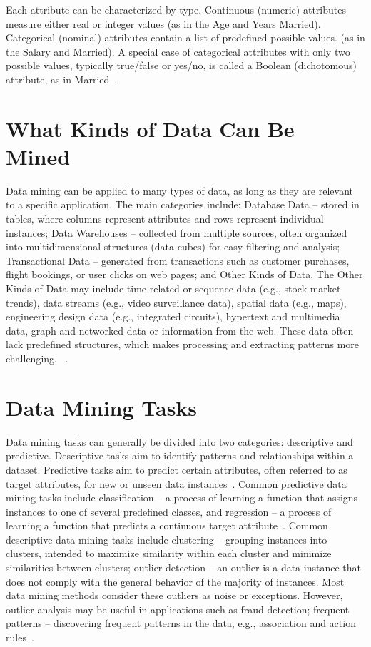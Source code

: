 Each attribute can be characterized by type. Continuous (numeric) attributes measure either real or integer values (as in the Age and Years Married). Categorical (nominal) attributes contain a list of predefined possible values. (as in the Salary and Married). A special case of categorical attributes with only two possible values, typically true/false or yes/no, is called a Boolean (dichotomous) attribute, as in Married~\parencite{Witten2020}.

\section{What Kinds of Data Can Be Mined}

Data mining can be applied to many types of data, as long as they are relevant to a specific application. The main categories include: Database Data – stored in tables, where columns represent attributes and rows represent individual instances; Data Warehouses – collected from multiple sources, often organized into multidimensional structures (data cubes) for easy filtering and analysis; Transactional Data – generated from transactions such as customer purchases, flight bookings, or user clicks on web pages; and Other Kinds of Data.
The Other Kinds of Data may include time-related or sequence data (e.g., stock market trends), data streams (e.g., video surveillance data), spatial data (e.g., maps), engineering design data (e.g., integrated circuits), hypertext and multimedia data, graph and networked data or information from the web. These data often lack predefined structures, which makes processing and extracting patterns more challenging. ~\parencite{Han2012}. 

\section{Data Mining Tasks}

Data mining tasks can generally be divided into two categories: descriptive and predictive. Descriptive tasks aim to identify patterns and relationships within a dataset. Predictive tasks aim to predict certain attributes, often referred to as target attributes, for new or unseen data instances~\parencite{Han2012}.
Common predictive data mining tasks include classification – a process of learning a function that assigns instances to one of several predefined classes, and regression – a process of learning a function that predicts a continuous target attribute~\parencite{Fayyad1996}.
Common descriptive data mining tasks include clustering – grouping instances into clusters, intended to maximize similarity within each cluster and minimize similarities between clusters; outlier detection – an outlier is a data instance that does not comply with the general behavior of the majority of instances. Most data mining methods consider these outliers as noise or exceptions. However, outlier analysis may be useful in applications such as fraud detection; frequent patterns – discovering frequent patterns in the data, e.g., association and action rules~\parencite{Han2012}.